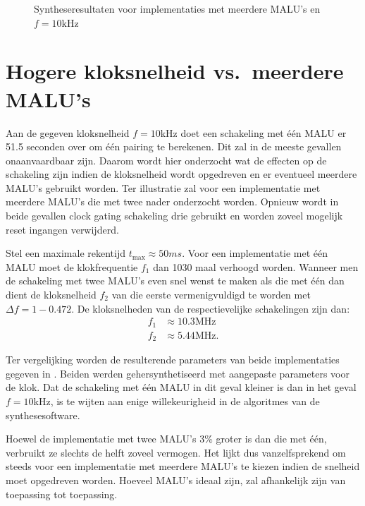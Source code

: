 \begin{figure}[h]
	\centering
		\caption{Syntheseresultaten voor implementaties met meerdere MALU's en $f = 10$kHz\label{figuur-resultaten-md}}
\end{figure}

\section{Hogere kloksnelheid vs.\ meerdere MALU's}

Aan de gegeven kloksnelheid $f = 10$kHz doet een schakeling met \'e\'en MALU er 51.5 seconden over om \'e\'en pairing te berekenen. Dit zal  in de meeste gevallen onaanvaardbaar zijn. Daarom wordt hier onderzocht wat de effecten op de schakeling zijn indien de kloksnelheid wordt opgedreven en er eventueel meerdere MALU's gebruikt worden. Ter illustratie zal voor een implementatie met meerdere MALU's die met twee nader onderzocht worden. Opnieuw wordt in beide gevallen clock gating schakeling drie gebruikt en worden zoveel mogelijk reset ingangen verwijderd.

Stel een maximale rekentijd $t_{\text{max}} \approx 50ms$. Voor een implementatie met \'e\'en MALU moet de klokfrequentie $f_1$ dan 1030 maal verhoogd worden. Wanneer men de schakeling met twee MALU's even snel wenst te maken als die met \'e\'en dan dient de kloksnelheid $f_2$ van die eerste vermenigvuldigd te worden met $\Delta f = 1 - 0.472$.
De kloksnelheden van de respectievelijke schakelingen zijn dan:
\[\begin{aligned}
f_1	&\approx 10.3\text{MHz}\\
f_2	&\approx 5.44\text{MHz}.
\end{aligned}\]

Ter vergelijking worden de resulterende parameters van beide implementaties gegeven in . Beiden werden gehersynthetiseerd met aangepaste parameters voor de klok. Dat de schakeling met \'e\'en MALU in dit geval kleiner is dan in het geval $f = 10$kHz, is te wijten aan enige willekeurigheid in de algoritmes van de synthesesoftware.

Hoewel de implementatie met twee MALU's 3\% groter is dan die met \'e\'en, verbruikt ze slechts de helft zoveel vermogen. Het lijkt dus vanzelfsprekend om steeds voor een implementatie met meerdere MALU's te kiezen indien de snelheid moet opgedreven worden. Hoeveel MALU's ideaal zijn, zal afhankelijk zijn van toepassing tot toepassing.

